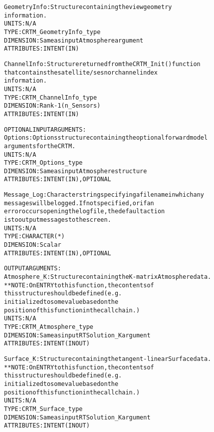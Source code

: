 \begin{alltt}
        GeometryInfo:   Structure containing the view geometry
                        information.
                        UNITS:      N/A
                        TYPE:       CRTM_GeometryInfo_type
                        DIMENSION:  Same as input Atmosphere argument
                        ATTRIBUTES: INTENT(IN)
 
        ChannelInfo:    Structure returned from the CRTM_Init() function
                        that contains the satellite/sesnor channel index
                        information.
                        UNITS:      N/A
                        TYPE:       CRTM_ChannelInfo_type
                        DIMENSION:  Rank-1 (n_Sensors)
                        ATTRIBUTES: INTENT(IN)
 
  OPTIONAL INPUT ARGUMENTS:
        Options:        Options structure containing the optional forward model
                        arguments for the CRTM.
                        UNITS:      N/A
                        TYPE:       CRTM_Options_type
                        DIMENSION:  Same as input Atmosphere structure
                        ATTRIBUTES: INTENT(IN), OPTIONAL
 
        Message_Log:    Character string specifying a filename in which any
                        messages will be logged. If not specified, or if an
                        error occurs opening the log file, the default action
                        is to output messages to the screen.
                        UNITS:      N/A
                        TYPE:       CHARACTER(*)
                        DIMENSION:  Scalar
                        ATTRIBUTES: INTENT(IN), OPTIONAL
 
  OUTPUT ARGUMENTS:
        Atmosphere_K:   Structure containing the K-matrix Atmosphere data.
                        **NOTE: On ENTRY to this function, the contents of
                                this structure should be defined (e.g.
                                initialized to some value based on the
                                position of this function in the call chain.)
                        UNITS:      N/A
                        TYPE:       CRTM_Atmosphere_type
                        DIMENSION:  Same as input RTSolution_K argument
                        ATTRIBUTES: INTENT(IN OUT)
 
        Surface_K:      Structure containing the tangent-linear Surface data.
                        **NOTE: On ENTRY to this function, the contents of
                                this structure should be defined (e.g.
                                initialized to some value based on the
                                position of this function in the call chain.)
                        UNITS:      N/A
                        TYPE:       CRTM_Surface_type
                        DIMENSION:  Same as input RTSolution_K argument
                        ATTRIBUTES: INTENT(IN OUT)
 

\end{alltt}

